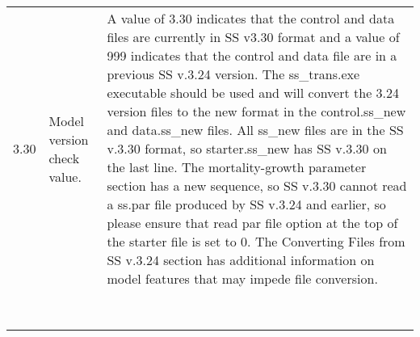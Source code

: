 {\begin{landscape}
\begin{longtable}{p{1.5cm} p{7.2cm} p{12.3cm}}
 \pagebreak
 \hline
 \hypertarget{Convert}{3.30} & Model version check value. & \multirow{1}{1cm}[-0.25cm]{\parbox{12.5cm}{ A value of 3.30 indicates that the control and data files are currently in SS v3.30 format and a value of 999 indicates that the control and data file are in a previous SS v.3.24 version. The ss\_trans.exe executable should be used and will convert the 3.24 version files to the new format in the control.ss\_new and data.ss\_new files.  All ss\_new files are in the SS v.3.30 format, so starter.ss\_new has SS v.3.30 on the last line.  The mortality-growth parameter section has a new sequence, so SS v.3.30 cannot read a ss.par file produced by SS v.3.24 and earlier, so please ensure that read par file option at the top of the starter file is set to 0. The \hypertarget{ConvIssues}  {Converting Files from SS v.3.24} section has additional information on model features that may impede file conversion.}}\Tstrut\\
     & & \\  
     & & \\  
	 & & \\
     & & \\
   	 & & \\
     & & \\  
     & & \\  
     & & \\       
\end{longtable}
\end{landscape}
}
\restoregeometry





\pagebreak

